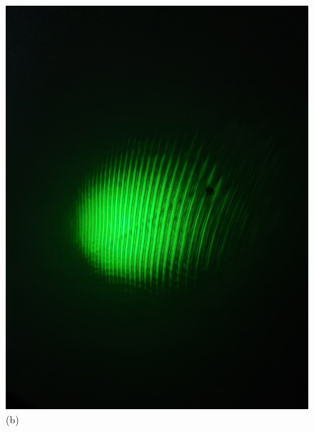 \documentclass[a4paper,12pt]{article}
\begin{document}
\begin{figure}[H]
\begin{minipage}[b]{0.3\textwidth}
        \includegraphics[scale=0.08]{pic_2.png}
        \caption*{(b)}
    \end{minipage}
    \begin{minipage}[b]{0.3\textwidth}

\end{minipage}
\end{figure}
\end{document}
